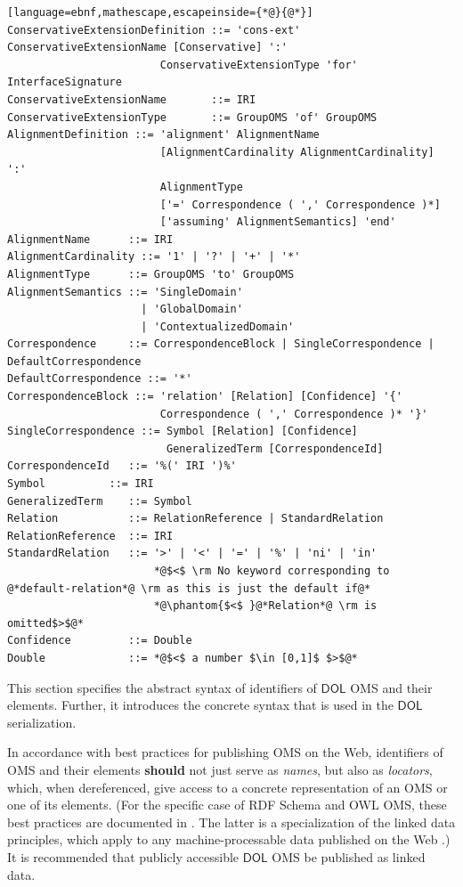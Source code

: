 \documentclass[10pt, a4paper]{isov2}
\makeatletter
\newcommand*\CommentAuthor{}
\renewcommand*\CommentAuthor{#1}}
\newcommand*\CommentDate{}
\renewcommand*\CommentDate{#1}}
\newcommand*\CommentId{}
\renewcommand*\CommentId{#1}}
\newcommand*\CommentType{}
\renewcommand*\CommentType{#1}}
\newcommand*{\SetCommentColorByType}[1]{%
\edef\localType{{#1}}%
\expandafter\ifstrequal\localType{q-aut}{\colorlet{CommentColor}{red}}{%
\expandafter\ifstrequal\localType{q-all}{\colorlet{CommentColor}{orange}}{%
\expandafter\ifstrequal\localType{todo}{\colorlet{CommentColor}{orange}}{%
\expandafter\ifstrequal\localType{fyi}{\colorlet{CommentColor}{lightgray}}{%
\colorlet{CommentColor}{yellow}}}}}}
\newcommand*{\SetCommentPrefixByType}[1]{%
\edef\localType{{#1}}%
\expandafter\@ifmtarg\localType{%
\edef\CommentPrefix{}%
}{%
\caseupper[q]{#1}%
\edef\CommentPrefix{\thestring: }%
}}
\newcommand*{\initComment}[1]{%
\setkeys{Comment}{#1}%
\SetCommentColorByType{\CommentType}%
\relax%
\SetCommentPrefixByType{\CommentType}%
\relax%
}
\newcommand*{\todonote}[2][]{%
\initComment{#1}%
\pdfcomment[author=\CommentAuthor,color=CommentColor,date=\CommentDate,id=\CommentId]{%
\CommentPrefix
#2}}
\renewcommand*{\todonote}[2][]{%
\initComment{#1}%
\ednote{\CommentPrefix #2}}
\newcommand*{\CLnote}[2][author=Christoph Lange]{%
\todonote[author=Christoph Lange,#1]{#2}}
\newcommand*{\should}{\textbf{should}\xspace}
\newcommand*{\DOL}{\ensuremath{\mathsf{DOL}}\xspace}
\makeatother
\begin{document}
\begin{lstlisting}[language=ebnf,mathescape,escapeinside={*@}{@*}]
ConservativeExtensionDefinition ::= 'cons-ext' ConservativeExtensionName [Conservative] ':'
                        ConservativeExtensionType 'for' InterfaceSignature
ConservativeExtensionName       ::= IRI
ConservativeExtensionType       ::= GroupOMS 'of' GroupOMS
AlignmentDefinition ::= 'alignment' AlignmentName
                        [AlignmentCardinality AlignmentCardinality] ':'
                        AlignmentType
                        ['=' Correspondence ( ',' Correspondence )*]
                        ['assuming' AlignmentSemantics] 'end'
AlignmentName      ::= IRI
AlignmentCardinality ::= '1' | '?' | '+' | '*'
AlignmentType      ::= GroupOMS 'to' GroupOMS
AlignmentSemantics ::= 'SingleDomain'
                     | 'GlobalDomain'
                     | 'ContextualizedDomain'
Correspondence     ::= CorrespondenceBlock | SingleCorrespondence | DefaultCorrespondence
DefaultCorrespondence ::= '*' 
CorrespondenceBlock ::= 'relation' [Relation] [Confidence] '{'
                        Correspondence ( ',' Correspondence )* '}'
SingleCorrespondence ::= Symbol [Relation] [Confidence]
                         GeneralizedTerm [CorrespondenceId]
CorrespondenceId   ::= '%(' IRI ')%'
Symbol          ::= IRI
GeneralizedTerm    ::= Symbol
Relation           ::= RelationReference | StandardRelation
RelationReference  ::= IRI
StandardRelation   ::= '>' | '<' | '=' | '%' | 'ni' | 'in'
                       *@$<$ \rm No keyword corresponding to @*default-relation*@ \rm as this is just the default if@*
                       *@\phantom{$<$ }@*Relation*@ \rm is omitted$>$@*
Confidence         ::= Double
Double             ::= *@$<$ a number $\in [0,1]$ $>$@*
\end{lstlisting}




\label{c:identifiers}
This section specifies the abstract syntax of identifiers of \DOL OMS and their elements. Further, 
it introduces the concrete syntax that is used in the \DOL serialization. 
\label{c:iris}


In accordance with best practices for publishing OMS on the Web, identifiers of OMS and their 
elements \should not just serve as \emph{names}, but also as \emph{locators}, which, when 
dereferenced, give access to a concrete representation of an OMS or one of its elements.  (For the 
specific case of RDF Schema and OWL OMS, these best practices are documented in 
\cite{W3C:NOTE-swbp-vocab-pub-20080828}.  The latter is a specialization of the linked data 
principles, which apply to any machine-processable data published on the Web 
\cite{BernersLee:LinkedData2006}.)  It is recommended that publicly accessible \DOL OMS be published 
as linked data.
\end{document}
